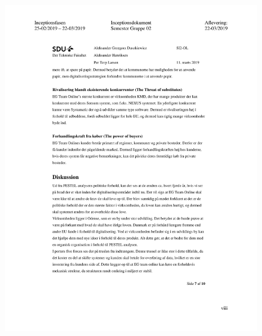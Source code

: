 \begin{figure}[hb]
  \includegraphics[scale = 0.33]{./PNG/Inceptions/Gruppe 02 + InceptionsDokument-41.jpg} 
\end{figure}

